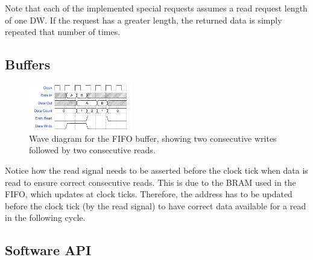 Note that each of the implemented special requests assumes a read request length of one DW.
If the request has a greater length, the returned data is simply repeated that number of times.

\subsection{Buffers}


\begin{figure}[!ht]
    \centering
    \includegraphics[width=0.40\textwidth]{figures/wavediagram-fifo}
    \caption{Wave diagram for the FIFO buffer, showing two consecutive writes followed by two consecutive reads.}
    \label{fig:wavediagram-fifo}
\end{figure}

Notice how the read signal needs to be asserted before the clock tick when data is read to ensure correct consecutive reads.
This is due to the BRAM used in the FIFO, which updates at clock ticks.
Therefore, the address has to be updated before the clock tick (by the read signal) to have correct data available for a read in the following cycle.

\subsection{Software API}


